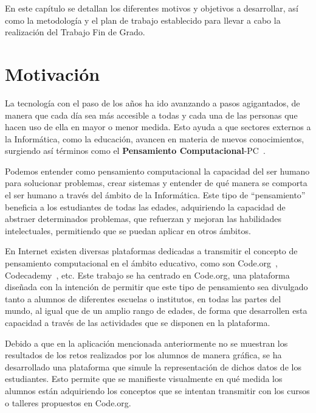 
En este capítulo se detallan los diferentes motivos y objetivos a desarrollar, así como la metodología y el plan de trabajo establecido para llevar a cabo la realización del Trabajo Fin de Grado.

\section{Motivación}
\label{1:sec:1}

La tecnología con el paso de los años ha ido avanzando a pasos agigantados, de manera que cada día sea más accesible a todas y cada una de las personas que hacen uso de ella en mayor o menor medida. Esto ayuda a que sectores externos a la Informática, como la educación, avancen en materia de nuevos conocimientos,
surgiendo así términos como el \textbf{Pensamiento Computacional}-PC~\cite{M.Wing2006}.

Podemos entender como pensamiento computacional la capacidad del ser humano para solucionar problemas, crear sistemas y entender de qué manera se comporta el ser humano a través del ámbito de la Informática. Este tipo de ``pensamiento'' beneficia a los estudiantes de todas las edades, adquiriendo la capacidad de abstraer determinados
problemas, que refuerzan y mejoran las habilidades intelectuales, permitiendo que se puedan aplicar en otros ámbitos.

En Internet existen diversas plataformas dedicadas a transmitir el concepto de pensamiento computacional en el ámbito educativo, como son Code.org~\cite{Code.org}, Codecademy~\cite{Codecademy}, etc. Este trabajo se ha centrado en Code.org, una plataforma diseñada con la intención de permitir que este tipo de pensamiento sea divulgado tanto a alumnos de diferentes
escuelas o institutos, en todas las partes del mundo, al igual que de un amplio rango de edades, de forma que desarrollen esta capacidad a través de las actividades que se disponen en la plataforma.

Debido a que en la aplicación mencionada anteriormente no se muestran los resultados de los retos realizados por los alumnos de manera gráfica, se ha desarrollado una plataforma que simule la representación de dichos datos de los estudiantes. Esto permite que se manifieste visualmente en qué medida los alumnos están adquiriendo los conceptos
que se intentan transmitir con los cursos o talleres propuestos en Code.org. 

